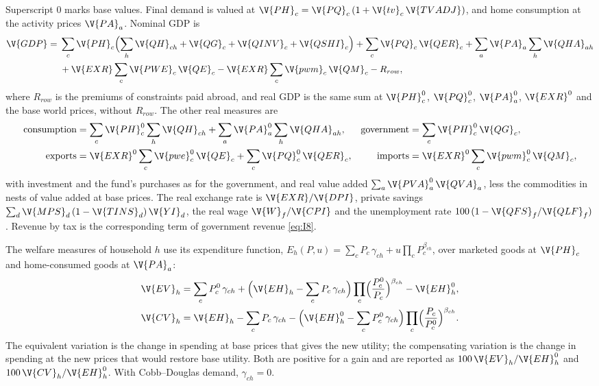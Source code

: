 Superscript 0 marks base values. Final demand is valued at
$\V{PH}_c = \V{PQ}_c\,(1 + \V{tv}_c\,\V{TVADJ})$, and home consumption at the
activity prices $\V{PA}_a$. Nominal GDP is
\begin{equation*}
\begin{split}
\V{GDP} = {}& \sum_c \V{PH}_c \Bigl(\sum_h \V{QH}_{ch} + \V{QG}_c + \V{QINV}_c + \V{QSHI}_c\Bigr)
  + \sum_c \V{PQ}_c\,\V{QER}_c + \sum_a \V{PA}_a \sum_h \V{QHA}_{ah}\\
&+ \V{EXR} \sum_c \V{PWE}_c\,\V{QE}_c - \V{EXR} \sum_c \V{pwm}_c\,\V{QM}_c - R_{row},
\end{split}
\end{equation*}
where $R_{row}$ is the premiums of constraints paid abroad, and real GDP is the
same sum at $\V{PH}^0_c$, $\V{PQ}^0_c$, $\V{PA}^0_a$, $\V{EXR}^0$ and the base
world prices, without $R_{row}$. The other real measures are
\begin{align*}
\text{consumption} &= \sum_c \V{PH}^0_c \sum_h \V{QH}_{ch} + \sum_a \V{PA}^0_a \sum_h \V{QHA}_{ah}, &
\text{government} &= \sum_c \V{PH}^0_c\,\V{QG}_c,\\
\text{exports} &= \V{EXR}^0 \sum_c \V{pwe}^0_c\,\V{QE}_c + \sum_c \V{PQ}^0_c\,\V{QER}_c, &
\text{imports} &= \V{EXR}^0 \sum_c \V{pwm}^0_c\,\V{QM}_c,
\end{align*}
with investment and the fund's purchases as for the government, and real value
added $\sum_a \V{PVA}^0_a\,\V{QVA}_a$, less the commodities in nests of value
added at base prices. The real exchange rate is $\V{EXR}/\V{DPI}$, private
savings $\sum_d \V{MPS}_d\,(1 - \V{TINS}_d)\,\V{YI}_d$, the real wage
$\V{W}_f/\V{CPI}$ and the unemployment rate $100\,(1 - \V{QFS}_f/\V{QLF}_f)$.
Revenue by tax is the corresponding term of government revenue \eqref{eq:I8}.

The welfare measures of household $h$ use its expenditure function,
$E_h(P, u) = \sum_c P_c\,\gamma_{ch} + u \prod_c P_c^{\beta_{ch}}$, over
marketed goods at $\V{PH}_c$ and home-consumed goods at $\V{PA}_a$:
\begin{align*}
\V{EV}_h &= \sum_c P^0_c\,\gamma_{ch}
  + \Bigl(\V{EH}_h - \sum_c P_c\,\gamma_{ch}\Bigr) \prod_c \Bigl(\frac{P^0_c}{P_c}\Bigr)^{\beta_{ch}}
  - \V{EH}^0_h,\\
\V{CV}_h &= \V{EH}_h - \sum_c P_c\,\gamma_{ch}
  - \Bigl(\V{EH}^0_h - \sum_c P^0_c\,\gamma_{ch}\Bigr) \prod_c \Bigl(\frac{P_c}{P^0_c}\Bigr)^{\beta_{ch}}.
\end{align*}
The equivalent variation is the change in spending at base prices that gives
the new utility; the compensating variation is the change in spending at the
new prices that would restore base utility. Both are positive for a gain and
are reported as $100\,\V{EV}_h/\V{EH}^0_h$ and $100\,\V{CV}_h/\V{EH}^0_h$. With
Cobb--Douglas demand, $\gamma_{ch} = 0$.

